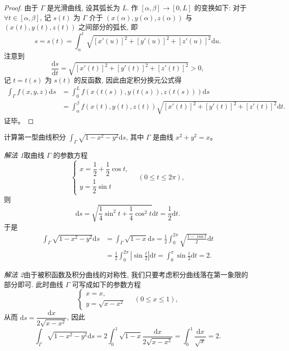 \documentclass[UTF8,12pt,a4paper,fontset=fandol]{ctexart}
\begin{document}
\begin{proof}\quad 由于 $\Gamma$ 是光滑曲线, 设其弧长为 $L$. 作 $[\alpha,\beta]\to[0,L]$ 的变换如下: 对于 $\forall t\in[\alpha,\beta]$, 记 $s(t)$ 为 $\Gamma$ 介于 $(x(\alpha),y(\alpha),z(\alpha))$ 与 $(x(t),y(t),z(t))$ 之间部分的弧长, 即
\[
  s=s(t)=\int_\alpha^t \sqrt{[x'(u)]^2+[y'(u)]^2+[z'(u)]^2}\mathrm du.
\]
注意到
\[
  \frac{\mathrm ds}{\mathrm dt}
  =\sqrt{[x'(t)]^2+[y'(t)]^2+[z'(t)]^2}>0,
\]
记 $t=t(s)$ 为 $s(t)$ 的反函数, 因此由定积分换元公式得
\[
\begin{aligned}
  \int_\Gamma f(x,y,z)\mathrm ds
  &=\int_0^L f(x(t(s)),y(t(s)),z(t(s)))\mathrm ds\\
  &=\int_\alpha^\beta f(x(t),y(t),z(t))
    \sqrt{[x'(t)]^2+[y'(t)]^2+[z'(t)]^2}\mathrm dt.
\end{aligned}
\]
证毕。

\end{proof}
\begin{example}\label{course-example-16-1-1}\quad 计算第一型曲线积分 $\int_\Gamma \sqrt{1-x^2-y^2}\mathrm ds$, 其中 $\Gamma$ 是曲线 $x^2+y^2=x$。

\end{example}
\noindent\emph{解法 1}\quad 取曲线 $\Gamma$ 的参数方程
\[
  \begin{cases}
    x=\dfrac12+\dfrac12\cos t,\\
    y=\dfrac12\sin t
  \end{cases}
  \quad(0\leqslant t\leqslant 2\pi),
\]
则
\[
  \mathrm ds=\sqrt{\frac14\sin^2t+\frac14\cos^2t}\mathrm dt
  =\frac12\mathrm dt.
\]
于是
\[
\begin{aligned}
  \int_\Gamma \sqrt{1-x^2-y^2}\mathrm ds
  &=\int_\Gamma \sqrt{1-x}\mathrm ds
    =\frac12\int_0^{2\pi}\sqrt{\frac{1-\cos t}{2}}\mathrm dt\\
  &=\frac12\int_0^{2\pi}\left|\sin\frac t2\right|\mathrm dt
    =\int_0^\pi\sin\frac t2\mathrm dt=2.
\end{aligned}
\]

\noindent\emph{解法 2}\quad 由于被积函数及积分曲线的对称性, 我们只要考虑积分曲线落在第一象限的部分即可. 此时曲线 $\Gamma$ 可写成如下的参数方程
\[
  \begin{cases}
    x=x,\\
    y=\sqrt{x-x^2}
  \end{cases}
  \quad(0\leqslant x\leqslant1),
\]
从而 $\mathrm ds=\dfrac{\mathrm dx}{2\sqrt{x-x^2}}$, 因此
\[
  \int_\Gamma \sqrt{1-x^2-y^2}\mathrm ds
  =2\int_0^1\sqrt{1-x}\frac{\mathrm dx}{2\sqrt{x-x^2}}
  =\int_0^1\frac{\mathrm dx}{\sqrt x}=2.
\]
\end{document}
